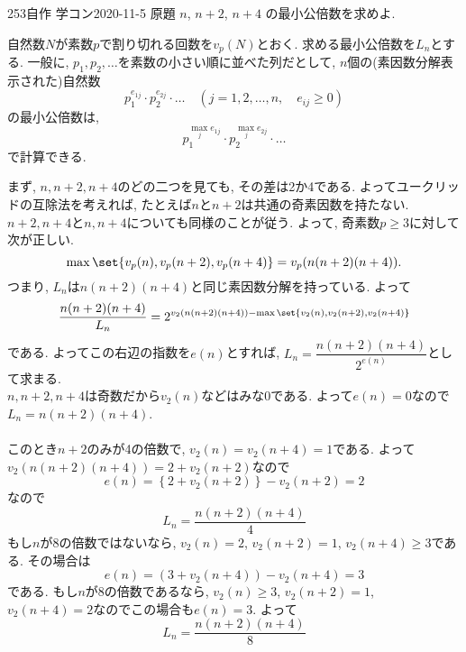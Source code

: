 \begin{thm}{253}{\maru}{自作 学コン2020-11-5 原題}
 $n$, $n+2$, $n+4$ の最小公倍数を求めよ.
\end{thm}

自然数$N$が素数$p$で割り切れる回数を$v_{p}(N)$とおく. 求める最小公倍数を$L_n$とする. 一般に, $p_1,p_2,\dots$を素数の小さい順に並べた列だとして, $n$個の(素因数分解表示された)自然数
\[
p_{1}^{e_{1j}}\cdot p_2^{e_{2j}} \cdot \dots \quad (j=1,2,\dots, n,\quad e_{ij} \geq 0)
\]
の最小公倍数は, 
\[p_1^{\max_{j} e_{1j}}\cdot p_2^{\max_{j} e_{2j}}\cdot \dots \]
で計算できる. \par 
まず, $n,n+2,n+4$のどの二つを見ても, その差は2か4である. よってユークリッドの互除法を考えれば, たとえば$n$と$n+2$は共通の奇素因数を持たない. $n+2,n+4$と$n,n+4$についても同様のことが従う. よって, 奇素数$p\geq 3$に対して次が正しい. 
\[\max{\set{v_{p}(n),v_{p}(n+2),v_{p}(n+4)}} = v_{p}(n(n+2)(n+4)).\]
つまり,  $L_n$は$n(n+2)(n+4)$と同じ素因数分解を持っている. よって
\[\dfrac{n(n+2)(n+4)}{L_n} = 2^{v_2(n(n+2)(n+4))- \max{\set{v_2(n), v_2(n+2), v_2(n+4)}}}\]
である. よってこの右辺の指数を$e(n)$とすれば, $L_n = \dfrac{n(n+2)(n+4)}{2^{e(n)}}$として求まる. \\
$n,n+2,n+4$は奇数だから$v_2(n)$などはみな0である. よって$e(n) = 0$なので$L_n=n(n+2)(n+4)$. \\
 \\
このとき$n+2$のみが4の倍数で, $v_2(n) = v_2(n+4) = 1$である. よって$v_2(n(n+2)(n+4)) = 2+v_2(n+2)$なので
\[e(n) = \left\{ 2+v_2(n+2)\right\} - v_2(n+2) = 2\]
なので
\[L_n = \dfrac{n(n+2)(n+4)}{4}\]
 もし$n$が8の倍数ではないなら, $v_2(n) = 2$, $v_2(n+2) = 1$, $v_2(n+4) \geq 3$である. その場合は
\[e(n) = (3+v_2(n+4)) - v_2(n+4) = 3 \]
である. もし$n$が8の倍数であるなら, $v_2(n)\geq 3$, $v_2(n+2) = 1$, $v_2(n+4) = 2$なのでこの場合も$e(n) = 3$. よって
\[L_n = \dfrac{n(n+2)(n+4)}{8}\]


